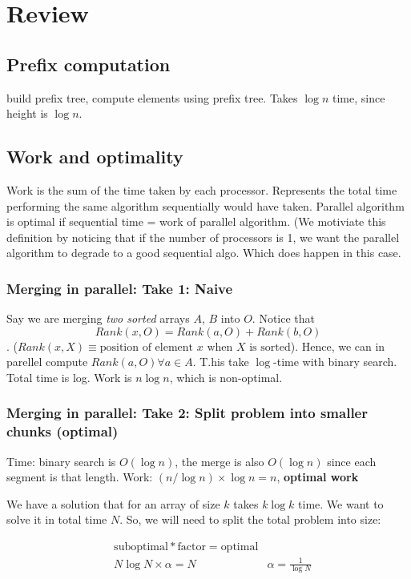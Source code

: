 \chapter{Review}

\section{Prefix computation}
build prefix tree, compute elements using prefix tree.
Takes $\log n$ time, since height is $\log n$.

\section{Work and optimality}
Work is the sum of the time taken by each processor. Represents the total
time performing the same algorithm sequentially would have taken. Parallel
algorithm is optimal if sequential time = work of parallel algorithm. (We
motiviate this definition by noticing that if the number of processors is 1,
we want the parallel algorithm to degrade to a good sequential algo. Which does
happen in this case.

\subsection{Merging in parallel: Take 1: Naive}
Say we are merging \textit{two sorted} arrays $A$, $B$ into $O$. Notice that
$$Rank(x, O) = Rank(a, O) + Rank(b, O)$$.
($Rank(x, X) \equiv \text{position of element $x$ when $X$ is sorted}$).
Hence, we can in parellel compute $Rank(a, O) \forall a \in A$. T.his take $\log$-time
with binary search. Total time is log. Work is $n \log n$, which is non-optimal.

\subsection{Merging in parallel: Take 2: Split problem into smaller chunks (\textbf{optimal})}

Time:  binary search is $O(\log n)$, the merge is also $O(\log n)$ since each segment is that length.
Work: $(n / \log n) \times \log n = n$, \textbf{optimal work}


We have a solution that for an array of size $k$ takes $k \log k$ time. We want
to solve it in total time $N$. So, we will need to split the total problem into
size:

\begin{align*}
    &\text{suboptimal} * \text{factor} = \text{optimal} \\
    &N \log N  \times \alpha = N
    &\alpha = \frac{1}{\log N}
\end{align*}

